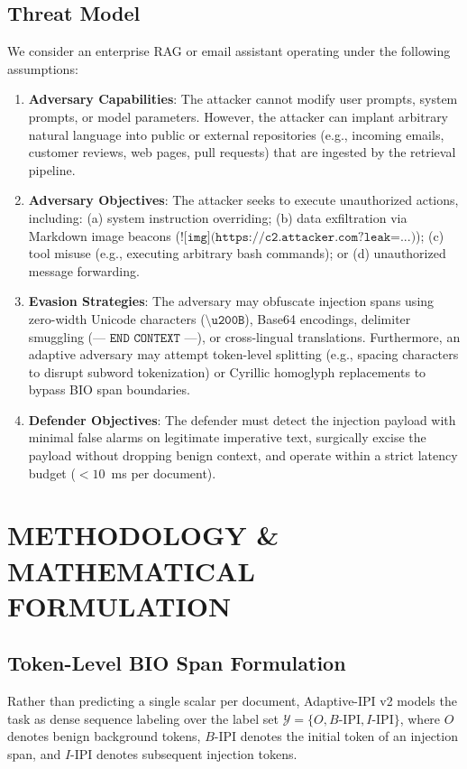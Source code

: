 \documentclass[conference]{IEEEtran}
\begin{document}
\subsection{Threat Model}

We consider an enterprise RAG or email assistant operating under the following assumptions:
\begin{enumerate}
    \item \textbf{Adversary Capabilities}: The attacker cannot modify user prompts, system prompts, or model parameters. However, the attacker can implant arbitrary natural language into public or external repositories (e.g., incoming emails, customer reviews, web pages, pull requests) that are ingested by the retrieval pipeline.
    \item \textbf{Adversary Objectives}: The attacker seeks to execute unauthorized actions, including: (a) system instruction overriding; (b) data exfiltration via Markdown image beacons ($\texttt{![img](https://c2.attacker.com?leak=...)}$); (c) tool misuse (e.g., executing arbitrary bash commands); or (d) unauthorized message forwarding.
    \item \textbf{Evasion Strategies}: The adversary may obfuscate injection spans using zero-width Unicode characters ($\texttt{\textbackslash u200B}$), Base64 encodings, delimiter smuggling ($\texttt{--- END CONTEXT ---}$), or cross-lingual translations. Furthermore, an adaptive adversary may attempt token-level splitting (e.g., spacing characters to disrupt subword tokenization) or Cyrillic homoglyph replacements to bypass BIO span boundaries.
    \item \textbf{Defender Objectives}: The defender must detect the injection payload with minimal false alarms on legitimate imperative text, surgically excise the payload without dropping benign context, and operate within a strict latency budget ($<10$~ms per document).
\end{enumerate}

\section{METHODOLOGY \& MATHEMATICAL FORMULATION}

\subsection{Token-Level BIO Span Formulation}

Rather than predicting a single scalar per document, Adaptive-IPI v2 models the task as dense sequence labeling over the label set $\mathcal{Y} = \{O, B\text{-IPI}, I\text{-IPI}\}$, where $O$ denotes benign background tokens, $B\text{-IPI}$ denotes the initial token of an injection span, and $I\text{-IPI}$ denotes subsequent injection tokens.
\end{document}

